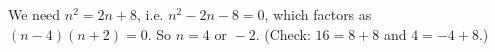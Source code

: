 We need $n^2=2n+8$, i.e. $n^2-2n-8=0$, which factors as $(n-4)(n+2)=0$. So $n=\boxed{4\text{ or }-2}$. (Check: $16=8+8$ and $4=-4+8$.)
